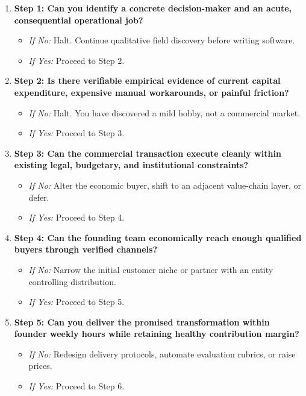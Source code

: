 \begin{enumerate}[leftmargin=14pt,itemsep=3pt,topsep=2pt]
  \item \textbf{Step 1: Can you identify a concrete decision-maker and an acute, consequential operational job?}
  \begin{itemize}[leftmargin=10pt,itemsep=1pt]
    \item \textit{If No:} Halt. Continue qualitative field discovery before writing software.
    \item \textit{If Yes:} Proceed to Step 2.
  \end{itemize}

  \item \textbf{Step 2: Is there verifiable empirical evidence of current capital expenditure, expensive manual workarounds, or painful friction?}
  \begin{itemize}[leftmargin=10pt,itemsep=1pt]
    \item \textit{If No:} Halt. You have discovered a mild hobby, not a commercial market.
    \item \textit{If Yes:} Proceed to Step 3.
  \end{itemize}

  \item \textbf{Step 3: Can the commercial transaction execute cleanly within existing legal, budgetary, and institutional constraints?}
  \begin{itemize}[leftmargin=10pt,itemsep=1pt]
    \item \textit{If No:} Alter the economic buyer, shift to an adjacent value-chain layer, or defer.
    \item \textit{If Yes:} Proceed to Step 4.
  \end{itemize}

  \item \textbf{Step 4: Can the founding team economically reach enough qualified buyers through verified channels?}
  \begin{itemize}[leftmargin=10pt,itemsep=1pt]
    \item \textit{If No:} Narrow the initial customer niche or partner with an entity controlling distribution.
    \item \textit{If Yes:} Proceed to Step 5.
  \end{itemize}

  \item \textbf{Step 5: Can you deliver the promised transformation within founder weekly hours while retaining healthy contribution margin?}
  \begin{itemize}[leftmargin=10pt,itemsep=1pt]
    \item \textit{If No:} Redesign delivery protocols, automate evaluation rubrics, or raise prices.
    \item \textit{If Yes:} Proceed to Step 6.
  \end{itemize}


\end{enumerate}
